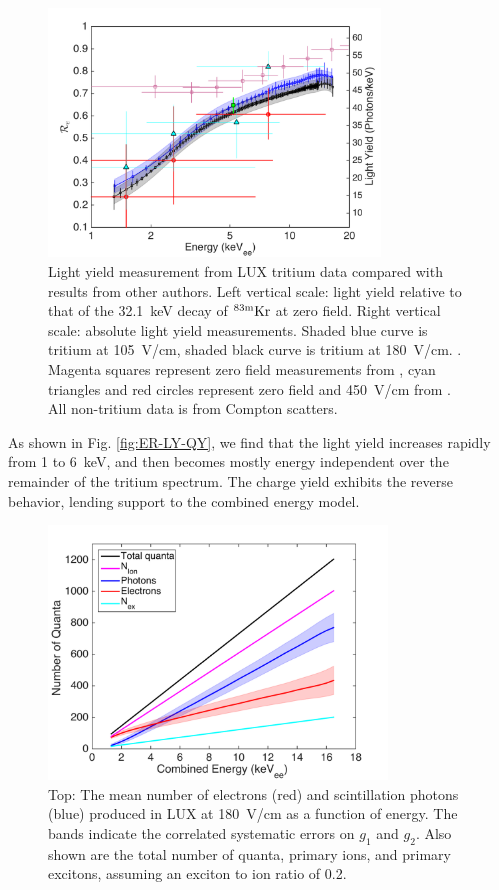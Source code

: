\begin{figure}[h!]
\includegraphics[width=88mm]{fig/Re_LY_log.png}
\caption{Light yield measurement from LUX tritium data compared with results from other authors. Left vertical scale: light yield relative to that of the 32.1~keV decay of $\rm ^{83m}Kr $ at zero field. Right vertical scale: absolute light yield measurements. Shaded blue curve is tritium at 105~V/cm, shaded black curve is tritium at 180~V/cm. . Magenta squares represent zero field measurements from \cite{Aprile_LY}, cyan triangles and red circles represent zero field and 450~V/cm from \cite{Baudis}. All non-tritium data is from Compton scatters. }
\label{fig:Re_LY}
\end{figure}


As shown in Fig. \ref{fig:ER-LY-QY}, we find that the light yield increases rapidly from 1 to 6~keV, and then becomes mostly energy independent over the remainder of the tritium spectrum. The charge yield exhibits the reverse behavior, lending support to the combined energy model. 

\begin{figure}[h!]
\includegraphics[width=90mm]{fig/quanta-vs-energy.png}
\caption{Top: The mean number of electrons (red) and scintillation photons (blue) produced in LUX at 180~V/cm as a function of energy. The bands indicate the correlated systematic errors on $g_1$ and $g_2$. Also shown are the total number of quanta, primary ions, and primary excitons, assuming an exciton to ion ratio of 0.2. }
\label{fig:quanta-vs-energy}
\end{figure}


